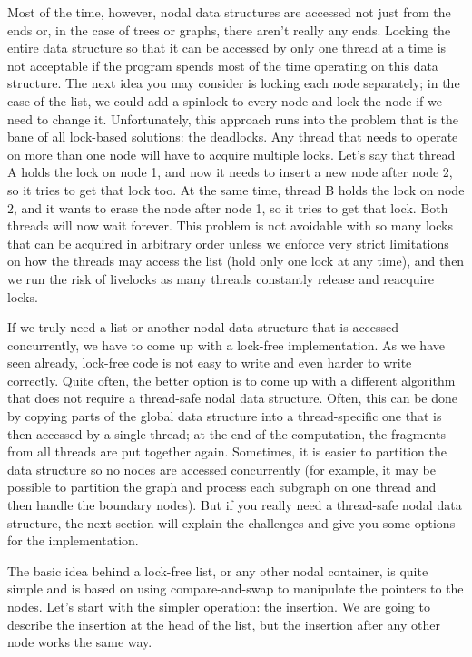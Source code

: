 Most of the time, however, nodal data structures are accessed not just from the ends or, in the case of trees or graphs, there aren't really any ends. Locking the entire data structure so that it can be accessed by only one thread at a time is not acceptable if the program spends most of the time operating on this data structure. The next idea you may consider is locking each node separately; in the case of the list, we could add a spinlock to every node and lock the node if we need to change it. Unfortunately, this approach runs into the problem that is the bane of all lock-based solutions: the deadlocks. Any thread that needs to operate on more than one node will have to acquire multiple locks. Let's say that thread A holds the lock on node 1, and now it needs to insert a new node after node 2, so it tries to get that lock too. At the same time, thread B holds the lock on node 2, and it wants to erase the node after node 1, so it tries to get that lock. Both threads will now wait forever. This problem is not avoidable with so many locks that can be acquired in arbitrary order unless we enforce very strict limitations on how the threads may access the list (hold only one lock at any time), and then we run the risk of livelocks as many threads constantly release and reacquire locks.

If we truly need a list or another nodal data structure that is accessed concurrently, we have to come up with a lock-free implementation. As we have seen already, lock-free code is not easy to write and even harder to write correctly. Quite often, the better option is to come up with a different algorithm that does not require a thread-safe nodal data structure. Often, this can be done by copying parts of the global data structure into a thread-specific one that is then accessed by a single thread; at the end of the computation, the fragments from all threads are put together again. Sometimes, it is easier to partition the data structure so no nodes are accessed concurrently (for example, it may be possible to partition the graph and process each subgraph on one thread and then handle the boundary nodes). But if you really need a thread-safe nodal data structure, the next section will explain the challenges and give you some options for the implementation.


The basic idea behind a lock-free list, or any other nodal container, is quite simple and is based on using compare-and-swap to manipulate the pointers to the nodes. Let's start with the simpler operation: the insertion. We are going to describe the insertion at the head of the list, but the insertion after any other node works the same way. 

